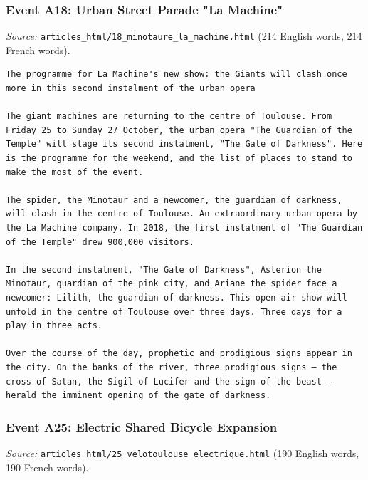 \subsubsection{Event A18: Urban Street Parade "La Machine"}
\emph{Source:} \texttt{articles\_html/18\_minotaure\_la_machine.html} (214 English words, 214 French words).

\begin{Verbatim}
The programme for La Machine's new show: the Giants will clash once more in this second instalment of the urban opera

The giant machines are returning to the centre of Toulouse. From Friday 25 to Sunday 27 October, the urban opera "The Guardian of the Temple" will stage its second instalment, "The Gate of Darkness". Here is the programme for the weekend, and the list of places to stand to make the most of the event.

The spider, the Minotaur and a newcomer, the guardian of darkness, will clash in the centre of Toulouse. An extraordinary urban opera by the La Machine company. In 2018, the first instalment of "The Guardian of the Temple" drew 900,000 visitors.

In the second instalment, "The Gate of Darkness", Asterion the Minotaur, guardian of the pink city, and Ariane the spider face a newcomer: Lilith, the guardian of darkness. This open-air show will unfold in the centre of Toulouse over three days. Three days for a play in three acts.

Over the course of the day, prophetic and prodigious signs appear in the city. On the banks of the river, three prodigious signs — the cross of Satan, the Sigil of Lucifer and the sign of the beast — herald the imminent opening of the gate of darkness.
\end{Verbatim}

\subsubsection{Event A25: Electric Shared Bicycle Expansion}
\emph{Source:} \texttt{articles\_html/25\_velotoulouse\_electrique.html} (190 English words, 190 French words).

